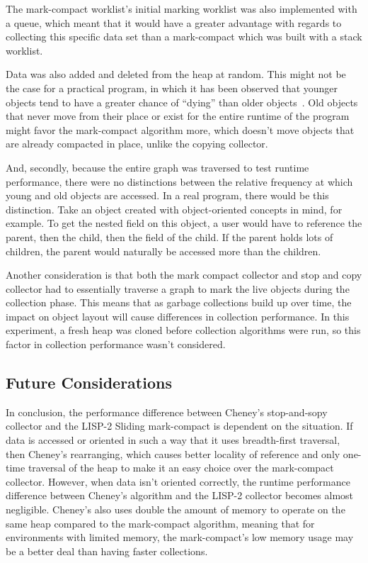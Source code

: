 \documentclass[index]{subfiles}
\begin{document}
The mark-compact worklist's initial marking worklist was also implemented with a queue, which meant that it would have a greater advantage with regards to collecting this specific data set than a mark-compact which was built with a stack worklist.

Data was also added and deleted from the heap at random. This might not be the case for a practical program, in which it has been observed that younger objects tend to have a greater chance of ``dying'' than older objects~\parencite{youtube_introductory_video}. Old objects that never move from their place or exist for the entire runtime of the program might favor the mark-compact algorithm more, which doesn't move objects that are already compacted in place, unlike the copying collector.

And, secondly, because the entire graph was traversed to test runtime performance, there were no distinctions between the relative frequency at which young and old objects are accessed. In a real program, there would be this distinction. Take an object created with object-oriented concepts in mind, for example. To get the nested field on this object, a user would have to reference the parent, then the child, then the field of the child. If the parent holds lots of children, the parent would naturally be accessed more than the children.

Another consideration is that both the mark compact collector and stop and copy collector had to essentially traverse a graph to mark the live objects during the collection phase. This means that as garbage collections build up over time, the impact on object layout will cause differences in collection performance. In this experiment, a fresh heap was cloned before collection algorithms were run, so this factor in collection performance wasn't considered.

\subsection{Future Considerations}

In conclusion, the performance difference between Cheney's stop-and-sopy collector and the LISP-2 Sliding mark-compact is dependent on the situation. If data is accessed or oriented in such a way that it uses breadth-first traversal, then Cheney's rearranging, which causes better locality of reference and only one-time traversal of the heap to make it an easy choice over the mark-compact collector. However, when data isn't oriented correctly, the runtime performance difference between Cheney's algorithm and the LISP-2 collector becomes almost negligible. Cheney's also uses double the amount of memory to operate on the same heap compared to the mark-compact algorithm, meaning that for environments with limited memory, the mark-compact's low memory usage may be a better deal than having faster collections.
\end{document}
